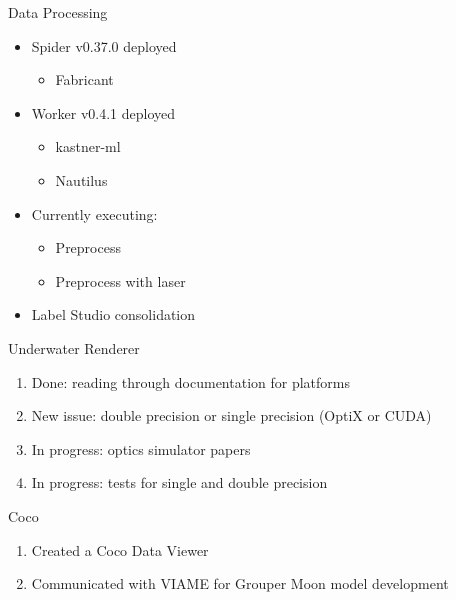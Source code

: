 \begin{frame}{Data Processing}
    \begin{itemize}
        \item Spider v0.37.0 deployed
        \begin{itemize}
            \item Fabricant
        \end{itemize}
        \item Worker v0.4.1 deployed
        \begin{itemize}
            \item kastner-ml
            \item Nautilus
        \end{itemize}
        \item Currently executing:
        \begin{itemize}
            \item Preprocess
            \item Preprocess with laser
        \end{itemize}
        \item Label Studio consolidation
    \end{itemize}
\end{frame}

\begin{frame}{Underwater Renderer}
    \begin{enumerate}
	\item Done: reading through documentation for platforms
	\item New issue: double precision or single precision (OptiX or CUDA)
	\item In progress: optics simulator papers
	\item In progress: tests for single and double precision
    \end{enumerate}
\end{frame}

\begin{frame}{Coco}
\begin{enumerate}
\item Created a Coco Data Viewer
\item Communicated with VIAME for Grouper Moon model development
\end{enumerate}
\end{frame}

